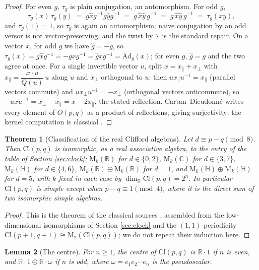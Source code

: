 \documentclass[11pt]{article}
\theoremstyle{plain}
\newtheorem{theorem}{Theorem}[section]
\newtheorem{lemma}[theorem]{Lemma}
\theoremstyle{definition}
\newcommand{\Cl}{\mathrm{Cl}}
\newcommand{\R}{\mathbb{R}}
\newcommand{\C}{\mathbb{C}}
\newcommand{\HH}{\mathbb{H}}
\newcommand{\Mat}{\mathrm{M}}
\newcommand{\Ad}{\mathrm{Ad}}
\begin{document}
\begin{proof}
For even $g$, $\tau_g$ is plain conjugation, an automorphism. For odd $g$,
\[
\tau_g(x)\,\tau_g(y) \;=\; g\hat{x}g^{-1}g\hat{y}g^{-1} \;=\; g\,\hat{x}\hat{y}\,g^{-1} \;=\; g\,\widehat{xy}\,g^{-1} \;=\; \tau_g(xy),
\]
and $\tau_g(1) = 1$, so $\tau_g$ is again an automorphism; naive conjugation by an odd versor is not vector-preserving, and the twist by $\hat{\cdot}$ is the standard repair. On a vector $x$, for odd $g$ we have $\hat{g} = -g$, so $\tau_g(x) = g\hat{x}g^{-1} = -gxg^{-1} = \hat{g}xg^{-1} = \Ad_g(x)$; for even $g$, $\hat{g} = g$ and the two agree at once. For a single invertible vector $u$, split $x = x_{\parallel} + x_{\perp}$ with $x_{\parallel} = \dfrac{x \cdot u}{Q(u)}\,u$ along $u$ and $x_{\perp}$ orthogonal to $u$: then $u x_{\parallel} u^{-1} = x_{\parallel}$ (parallel vectors commute) and $u x_{\perp} u^{-1} = -x_{\perp}$ (orthogonal vectors anticommute), so $-uxu^{-1} = x_{\perp} - x_{\parallel} = x - 2x_{\parallel}$, the stated reflection. Cartan--Dieudonn\'e \cite{Lam2005, Porteous1995} writes every element of $O(p,q)$ as a product of reflections, giving surjectivity; the kernel computation is classical \cite{Porteous1995}.
\end{proof}

\begin{theorem}[Classification of the real Clifford algebras]\label{tk:classification}
Let $d \equiv p - q \pmod 8$. Then $\Cl(p,q)$ is isomorphic, as a real associative algebra, to the entry of the table of Section \ref{sec:clock}: $\Mat_k(\R)$ for $d \in \{0, 2\}$, $\Mat_k(\C)$ for $d \in \{3, 7\}$, $\Mat_k(\HH)$ for $d \in \{4, 6\}$, $\Mat_k(\R) \oplus \Mat_k(\R)$ for $d = 1$, and $\Mat_k(\HH) \oplus \Mat_k(\HH)$ for $d = 5$, with $k$ fixed in each case by $\dim_\R \Cl(p,q) = 2^n$. In particular $\Cl(p,q)$ is simple except when $p - q \equiv 1 \pmod 4$, where it is the direct sum of two isomorphic simple algebras.
\end{theorem}

\begin{proof}
This is the theorem of the classical sources \cite{ABS1964, Porteous1995, Lounesto2001}, assembled from the low-dimensional isomorphisms of Section \ref{sec:clock} and the $(1,1)$-periodicity $\Cl(p{+}1,q{+}1) \cong \Mat_2(\Cl(p,q))$; we do not repeat their induction here.
\end{proof}

\begin{lemma}[The centre]\label{tk:center}
For $n \geq 1$, the centre of $\Cl(p,q)$ is $\R \cdot 1$ if $n$ is even, and $\R \cdot 1 \oplus \R \cdot \omega$ if $n$ is odd, where $\omega = e_1 e_2 \cdots e_n$ is the pseudoscalar.
\end{lemma}
\end{document}
